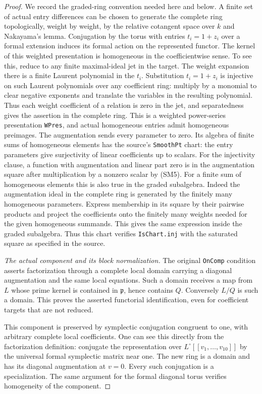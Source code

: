 \begin{proof}
We record the graded-ring convention needed here and
below. A finite set of actual entry differences can
be chosen to generate the complete ring topologically,
weight by weight, by the relative cotangent space
over \(k\) and Nakayama's lemma. Conjugation by
the torus with entries \(t_i=1+z_i\) over a formal
extension induces its formal action on the represented
functor. The kernel of this weighted presentation is
homogeneous in the coefficientwise sense. To see this,
reduce to any finite maximal-ideal jet in the target.
The weight expansion there is a finite Laurent polynomial
in the \(t_i\). Substitution \(t_i=1+z_i\) is injective
on such Laurent polynomials over any coefficient ring:
multiply by a monomial to clear negative exponents and
translate the variables in the resulting polynomial.
Thus each weight coefficient of a relation is zero
in the jet, and separatedness gives the assertion
in the complete ring. This is a weighted power-series
presentation \texttt{WPres}, and actual homogeneous
entries admit homogeneous preimages. The augmentation
sends every parameter to zero. Its algebra of finite
sums of homogeneous elements has the source's
\texttt{SmoothPt} chart: the entry parameters give
surjectivity of linear coefficients up to scalars.
For the injectivity clause, a function with augmentation
and linear part zero is in the augmentation square
after multiplication by a nonzero scalar by (SM5).
For a finite sum of homogeneous elements this is also
true in the graded subalgebra. Indeed the augmentation
ideal in the complete ring is generated by the finitely
many homogeneous parameters. Express membership in
its square by their pairwise products and project the
coefficients onto the finitely many weights needed
for the given homogeneous summands. This gives the
same expression inside the graded subalgebra. Thus
this chart verifies \texttt{IsChart.inj} with the
saturated square as specified in the source.

\emph{The actual component and its block normalization.}
The original \texttt{OnComp} condition asserts
factorization through a complete local domain carrying
a diagonal augmentation and the same local equations.
Such a domain receives a map from \(L\) whose prime
kernel is contained in \(\mathfrak p\), hence contains
\(Q\). Conversely \(L/Q\) is such a domain. This proves
the asserted functorial identification, even for
coefficient targets that are not reduced.

This component is preserved by symplectic conjugation
congruent to one, with arbitrary complete local
coefficients. One can see this directly from the
factorization definition: conjugate the representation
over \(L^\circ[[v_1,\ldots,v_{10}]]\) by the universal
formal symplectic matrix near one. The new ring is a
domain and has its diagonal augmentation at \(v=0\).
Every such conjugation is a specialization. The
same argument for the formal diagonal torus verifies
homogeneity of the component.


\end{proof}
